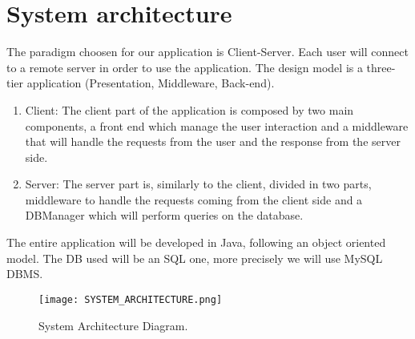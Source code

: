 \section{System architecture}
The paradigm choosen for our application is Client-Server.
Each user will connect to a remote server in order to use the application.
The design model is a three-tier application (Presentation, Middleware, Back-end).

\begin{enumerate}
	\item Client: The client part of the application is composed by two main components, a front end which manage the user interaction and a middleware that will handle the requests from the user and the response from the server side.
	\item Server: The server part is, similarly to the client, divided in two parts, middleware to handle the requests coming from the client side and a DBManager which will perform queries on the database.  
\end{enumerate}

The entire application will be developed in Java, following an object oriented model. The DB used will be an SQL one, more precisely we will use MySQL DBMS.

\begin{figure}
  \texttt{[image: SYSTEM\_ARCHITECTURE.png]}
  \caption{System Architecture Diagram.}
  \label{figureSYS_ARC}
\end{figure}

\pagebreak

